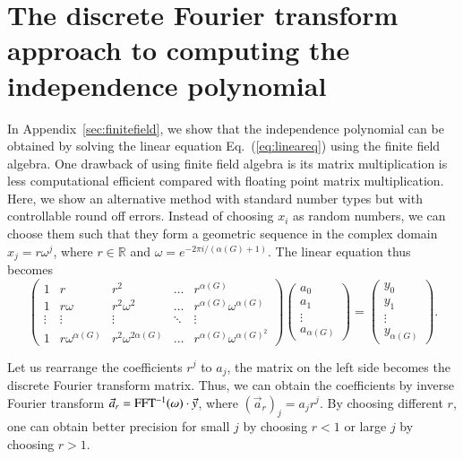 \documentclass[onefignum, onetabnum]{siamart190516}
\newcommand{\<}{\langle}
\renewcommand{\>}{\rangle}
\newcommand{\Eq}[1]{Eq.~(\ref{#1})}
\newcommand{\App}[1]{Appendix~\ref{#1}}
\begin{document}
\section{The discrete Fourier transform approach to computing the independence polynomial}\label{sec:fft}

In  \App{sec:finitefield}, we show that the independence polynomial can be obtained by solving the linear equation \Eq{eq:lineareq} using the finite field algebra.
One drawback of using finite field algebra is its matrix multiplication is less computational efficient compared with floating point matrix multiplication.
Here, we show an alternative method with standard number types but with controllable round off errors.
Instead of choosing $x_{i}$ as random numbers, we can choose them such that they form a geometric sequence in the complex domain $x_j = r\omega^j$, where $r \in \mathbb{R}$ and $\omega = e^{-2\pi i/( \alpha(G)+1)}$. The linear equation thus becomes
\begin{equation}
\left(\begin{matrix}
1 & r & r^2 & \ldots & r^{\alpha(G)} \\
1 & r\omega & r^2\omega^2 & \ldots & r^{\alpha(G)} \omega^{\alpha(G)} \\
\vdots & \vdots & \vdots &\ddots & \vdots \\
1 & r\omega^{\alpha(G)} & r^2\omega^{2{\alpha(G)}} & \ldots & r^{\alpha(G)}\omega^{{\alpha(G)}^2}
\end{matrix}\right)
\left(\begin{matrix}
a_0 \\ a_1 \\ \vdots \\ a_{\alpha(G)}
\end{matrix}\right)
= \left(\begin{matrix}
y_0 \\ y_1 \\ \vdots \\ y_{\alpha(G)}
\end{matrix}\right).
\end{equation}

Let us rearrange the coefficients $r^j$ to $a_j$, the matrix on the left side becomes the discrete Fourier transform matrix. Thus, we can obtain the coefficients by inverse Fourier transform $\vec a_r = {\rm FFT^{-1}}(\omega) \cdot \vec y$, where $(\vec a_r)_j = a_j r ^j$.
By choosing different $r$, one can obtain better precision for small $j$ by choosing $r<1$ or large $j$ by choosing $r>1$.
\end{document}

